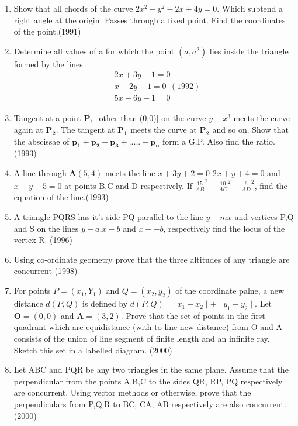 \documentclass[12pt]{article}
\let\vec\mathbf
\begin{document}
\begin{enumerate}
     
\newpage
\item Show that all chords of the curve  $2x^2-y^2-2x+4y=0$. Which subtend a right angle at the origin. Passes through a fixed point. Find the coordinates of the point.(1991)\\
\item Determine all values of a for which the point $(a, a^2)$ lies inside the triangle formed by the lines\\
\begin{align}
 &2x+3y-1 =0 \\
 &x+2y-1 =0 \ \: (1992)\\
 &5x-6y-1 =0 
\end{align}

\item Tangent at a point $\vec{P_1}$ [other than (0,0)] on the curve $y-x^3$ meets the curve again at $\vec{P_2}$. The tangent at $\vec{P_1}$ meets the curve at $\vec{P_2}$ and so on. Show that the abscissae of $\vec{p_1+p_2+p_3+.....+p_n}$ form a G.P. Also find the ratio.(1993)\\
\item A line through $\vec{A}(5,4)$ meets the line $x+3y+2=0$ $2x+y+4=0$ and $x-y-5=0$ at points B,C and D respectively. If    $\frac{15}{AB}^2+\frac{10}{AC}^2-\frac{6}{AD}^2$, find the equation of the line.(1993)\\
\item A triangle PQRS has it's side PQ parallel to the line $y-mx$ and vertices P,Q and S on the lines $y-a$,$ x-b$ and $x--b$, respectively find the locus of the vertex R. (1996)\\
\item Using co-ordinate geometry prove that the three altitudes of any triangle are concurrent (1998)\\
\item For points $P=(x_1,Y_1)$ and $Q=(x_2,y_2)$ of the coordinate palne, a new distance $d(P,Q)$ is defined by $d(P,Q)=\mid x_1-x_2\mid + \mid y_1-y_2\mid$. Let $\vec{O}=(0,0)$  and $\vec{A}=(3,2)$. Prove that the set of points in the first quadrant which are equidistance (with to line new distance) from O and A consists of the union of line segment of finite length and an infinite ray. Sketch this set in a labelled diagram. (2000)\\
\item Let ABC and PQR be any two triangles in the same plane. Assume that the perpendicular from the points A,B,C to the sides QR, RP, PQ respectively are concurrent. Using vector methods or otherwise, prove that the perpendiculars from P,Q,R to BC, CA, AB  respectively are also concurrent. (2000)\\

\end{enumerate}
\end{document}
